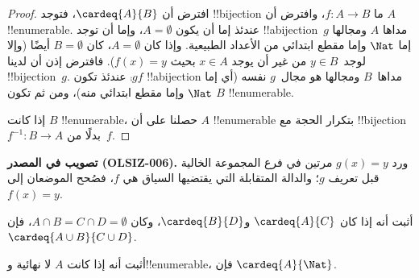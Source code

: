 \documentclass[../../../include/open-logic-section]{subfiles}
\begin{document}
\begin{proof}
افترض أن $\cardeq{A}{B}$، فتوجد !!{bijection} ما $f \colon A
\to B$، وافترض أن $A$ !!{enumerable}.
{
  عندئذ إما أن يكون $A  = \emptyset$، وإما أن توجد !!a{bijection}~$g$
  مداها $A$ ومجالها إما $\Nat$ وإما مقطع ابتدائي من الأعداد الطبيعية.
  وإذا كان $A = \emptyset$، كان $B =
  \emptyset$ أيضًا (وإلا لوجد~$y \in B$ من غير أن يوجد $x
  \in A$ بحيث $f(x) = y$). فافترض إذن أن لدينا
  !!{bijection}~$g$. عندئذ تكون $\comp{g}{f}$ !!a{bijection} مداها~$B$
  ومجالها هو مجال~$g$ نفسه (أي إما $\Nat$ وإما مقطع ابتدائي منه)،
  ومن ثم تكون $B$ !!{enumerable}.}

إذا كانت $B$ !!{enumerable}، حصلنا على أن $A$ !!{enumerable} بتكرار
الحجة مع !!{bijection} $f^{-1}\colon B \to A$ بدلًا من~$f$.
\end{proof}

\begin{editorial}
\textbf{تصويب في المصدر (OLSIZ-006).}
ورد $g(x)=y$ مرتين في فرع المجموعة الخالية قبل تعريف $g$؛ والدالة
المتقابلة التي يقتضيها السياق هي $f$، فصُحح الموضعان إلى $f(x)=y$.
\end{editorial}

\begin{prob}
أثبت أنه إذا كان $\cardeq{A}{C}$ و$\cardeq{B}{D}$، وكان $A \cap B =
C \cap D = \emptyset$، فإن $\cardeq{A \cup B}{C \cup D}$.
\end{prob}

\begin{prob}
أثبت أنه إذا كانت $A$ لا نهائية و!!{enumerable}، فإن
$\cardeq{A}{\Nat}$.
\end{prob}
\end{document}
